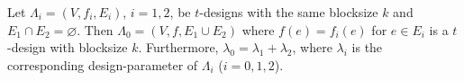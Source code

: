 Let $\Lambda_i = (V, f_i, E_i)$, $i = 1, 2$, be $t$-designs with the same blocksize $k$ and $E_1 \cap E_2 = \varnothing$. Then $\Lambda_0 = (V, f, E_1 \cup E_2)$ where $f(e) = f_i(e)$ for $e \in E_i$ is a $t$-design with blocksize $k$. Furthermore, $\lambda_0 = \lambda_1 + \lambda_2$, where $\lambda_i$ is the corresponding design-parameter of $\Lambda_i$ ($i = 0, 1, 2$).

